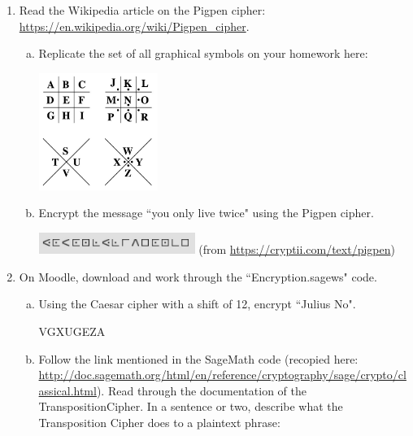 \documentclass[12pt]{amsart}
\theoremstyle{plain}
\theoremstyle{definition}
\begin{document}
\begin{enumerate}[1.]
	\item Read the Wikipedia article on the Pigpen cipher:\\ \url{https://en.wikipedia.org/wiki/Pigpen_cipher}.
	\begin{enumerate}[a.]
	\item Replicate the set of all graphical symbols on your homework here:
	\begin{framed}
	\begin{center}
	\includegraphics[height=1.5in]{Pigpen.jpg}
	\end{center}
	\end{framed}
	\item Encrypt the message ``you only live twice" using the Pigpen cipher.
	\begin{framed}
	\begin{center}
	\includegraphics[width=2in]{Pigpen02.jpg}
	(from \url{https://cryptii.com/text/pigpen})
	\end{center}
	\end{framed}
	\end{enumerate}
	\item On Moodle, download and work through the ``Encryption.sagews" code.\\
		\begin{enumerate}[a.]
		\item Using the Caesar cipher with a shift of 12, encrypt ``Julius No".\\
		\begin{framed}
		VGXUGEZA
		\end{framed}
		\item Follow the link mentioned in the SageMath code (recopied here: \url{http://doc.sagemath.org/html/en/reference/cryptography/sage/crypto/classical.html}).  Read through the documentation of the TranspositionCipher.  In a sentence or two, describe what the Transposition Cipher does to a plaintext phrase:
		\begin{framed}

\end{framed}
\end{enumerate}
\end{enumerate}
\end{document}
